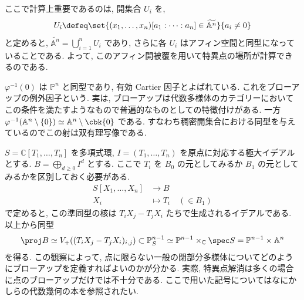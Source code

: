 \documentclass[openany, a4paper, oneside]{jsbook}
\begin{document}
ここで計算上重要であるのは, 開集合 $U_i$ を,
\begin{align}
 U_i
 \defeq
 \set{(x_1,\dots,x_n) [a_1:\dots:a_n] \in \widetilde{\mathbb{A}^n}}{a_i \neq 0}
\end{align}
と定めると, $\widetilde{\mathbb{A}^n} = \bigcup_{i=1}^n U_i$ であり,
さらに各 $U_i$ はアフィン空間と同型になっていることである.
よって, このアフィン開被覆を用いて特異点の場所が計算できるのである.
\begin{rem}
$\varphi^{-1}(0)$ は $\mathbb{P}^n$ と同型であり,
有効 Cartier 因子とよばれている.
これをブローアップの例外因子という.
実は, ブローアップは代数多様体のカテゴリーにおいてこの条件を満たすようなもので普遍的なものとしての特徴付けがある.
一方 $\varphi^{-1}(\mathbb{A}^n \setminus \{0\}) \simeq \mathbb{A}^n \setminus \cbk{0}$ である.
すなわち稠密開集合における同型を与えているのでこの射は双有理写像である. \fin
\end{rem}
\begin{rem}
$S=\mathbb{C}[T_1, \dots, T_n]$ を多項式環, $I=(T_1, \dots, T_n)$ を原点に対応する極大イデアルとする.
$B=\bigoplus_{d \geq 0} I^d$ とする.
ここで $T_i$ を $B_0$ の元としてみるか $B_1$ の元としてみるかを区別しておく必要がある.
\begin{align}
 S[X_1,\dots,X_n]
 &\longrightarrow
 B \\
 X_i
 &\longmapsto
 T_i \quad (\in B_1)
\end{align}
で定めると, この準同型の核は $T_iX_j - T_jX_i$ たちで生成されるイデアルである.
以上から同型
\begin{align}
 \proj B
 \simeq
 V_+ ((T_iX_j-T_jX_i)_{i,j})
 \subset
 \mathbb{P}_S^{n-1}
 \simeq
 \mathbb{P}^{n-1} \times_\mathbb{C} \spec S
 =
 \mathbb{P}^{n-1} \times \mathbb{A}^n
\end{align}
を得る.
この観察によって, 点に限らない一般の閉部分多様体についてどのようにブローアップを定義すればよいのかが分かる.
実際, 特異点解消は多くの場合に点のブローアップだけでは不十分である.
ここで用いた記号についてはなにかしらの代数幾何の本を参照されたい. \fin
\end{rem}
\end{document}
